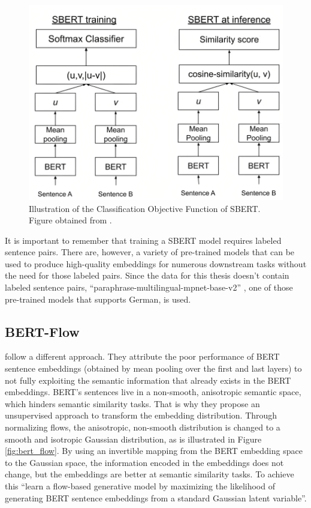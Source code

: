 \begin{figure}[h!]
\centering
\includegraphics[width = 0.8\linewidth]{figures/SBERT.png}
\caption{Illustration of the Classification Objective Function of SBERT. Figure obtained from \citet{sbert}.}
\label{fig:sbert}
\end{figure}

It is important to remember that training a SBERT model requires labeled sentence pairs. There are, however, a variety of pre-trained models that can be used to produce high-quality embeddings for numerous downstream tasks without the need for those labeled pairs. Since the data for this thesis doesn't contain labeled sentence pairs, ``paraphrase-multilingual-mpnet-base-v2'' \citep{reimers2019sbert}, one of those pre-trained models that supports German, is used.

\subsection{BERT-Flow}\label{bert-flow}

\citet{li2020bertflow} follow a different approach. They attribute the poor performance of BERT sentence embeddings (obtained by mean pooling over the first and last layers) to not fully exploiting the semantic information that already exists in the BERT embeddings. BERT's sentences live in a non-smooth, anisotropic semantic space, which hinders semantic similarity tasks. That is why they propose an unsupervised approach to transform the embedding distribution. Through normalizing flows, the anisotropic, non-smooth distribution is changed to a smooth and isotropic Gaussian distribution, as is illustrated in Figure \ref{fig:bert_flow}. By using an invertible mapping from the BERT embedding space to the Gaussian space, the information encoded in the embeddings does not change, but the embeddings are better at semantic similarity tasks. To achieve this \citet{li2020bertflow} ``learn a flow-based generative model by maximizing the likelihood of generating BERT sentence embeddings from a standard Gaussian latent variable''.

